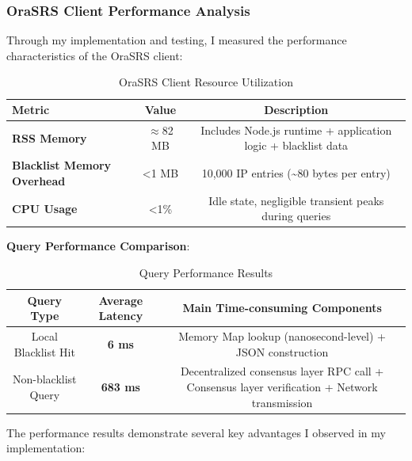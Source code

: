 \documentclass[12pt]{article}
\begin{document}
\subsubsection{OraSRS Client Performance Analysis}

Through my implementation and testing, I measured the performance characteristics of the OraSRS client:

\begin{table}[H]
\centering
\begin{tabular}{@{}lcc@{}}
\toprule
\textbf{Metric} & \textbf{Value} & \textbf{Description} \\
\midrule
\textbf{RSS Memory} & $\approx$82 MB & Includes Node.js runtime + application logic + blacklist data \\
\textbf{Blacklist Memory Overhead} & <1 MB & 10,000 IP entries (\textasciitilde 80 bytes per entry) \\
\textbf{CPU Usage} & <1\% & Idle state, negligible transient peaks during queries \\
\bottomrule
\end{tabular}
\caption{OraSRS Client Resource Utilization}
\label{tab:client_performance}
\end{table}

\textbf{Query Performance Comparison}:
\begin{table}[H]
\centering
\begin{tabular}{@{}ccc@{}}
\toprule
\textbf{Query Type} & \textbf{Average Latency} & \textbf{Main Time-consuming Components} \\
\midrule
Local Blacklist Hit & \textbf{6 ms} & Memory Map lookup (nanosecond-level) + JSON construction \\
Non-blacklist Query & \textbf{683 ms} & Decentralized consensus layer RPC call + Consensus layer verification + Network transmission \\
\bottomrule
\end{tabular}
\caption{Query Performance Results}
\label{tab:query_performance}
\end{table}

The performance results demonstrate several key advantages I observed in my implementation:
\end{document}
